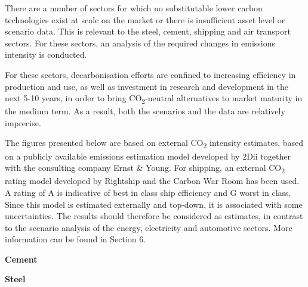 \documentclass[10pt,table]{article}\usepackage[]{graphicx}\usepackage[]{color}
\begin{document}
	\begin{multicols}{2}
		There are a number of sectors for which no substitutable lower carbon technologies exist at scale on the market or there is insufficient asset level or scenario data. This is relevant to the steel, cement, shipping and air transport sectors. For these sectors, an analysis of the required changes in emissions intensity is conducted. 

		For these sectors, decarbonisation efforts are confined to increasing efficiency in production and use, as well as investment in research and development in the next 5-10 years, in order to bring CO\textsubscript{2}-neutral alternatives to market maturity in the medium term. As a result, both the scenarios and the data are relatively imprecise.

		The figures presented below are based on external CO\textsubscript{2} intensity estimates, based on a publicly available emissions estimation model developed by 2Dii together with the consulting company Ernst \& Young. For shipping, an external CO\textsubscript{2} rating model developed by Rightship and the Carbon War Room has been used. A rating of A is indicative of best in class ship efficiency and G worst in class. Since this model is estimated externally and top-down, it is associated with some uncertainties. The results should therefore be considered as estimates, in contrast to the scenario analysis of the energy, electricity and automotive sectors. More information can be found in Section 6. 
	\end{multicols}

	\begin{multicols}{2}

		\textbf{Cement}

		\textbf{Steel}

	\end{multicols}

	\setlength\multicolsep{0pt}
	\vspace{0cm}
\end{document}
